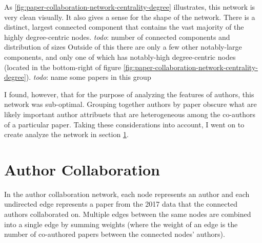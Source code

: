 \documentclass{article}
\newcommand{\todo}[1]{\textit{todo}: #1}
\begin{document}
As \ref{fig:paper-collaboration-network-centrality-degree} illustrates, this network is very clean visually.
It also gives a sense for the shape of the network.
There is a distinct, largest connected component that contains the vast majority of the highly degree-centric nodes.
\todo{number of connected components and distribution of sizes}
Outside of this there are only a few other notably-large components, and only one of which has notably-high degree-centric nodes (located in the bottom-right of figure \ref{fig:paper-collaboration-network-centrality-degree}).
\todo{name some papers in this group}

I found, however, that for the purpose of analyzing the features of authors, this network was sub-optimal.
Grouping together authors by paper obscure what are likely important author attribuets that are heterogeneous among the co-authors of a particular paper. Taking these considerations into account, I went on to create analyze the network in section \ref{sec:author-collaboration}.

\section{Author Collaboration}
\label{sec:author-collaboration}

In the author collaboration network, each node represents an author and each undirected edge represents a paper from the 2017 data that the connected authors collaborated on.
Multiple edges between the same nodes are combined into a single edge by summing weights (where the weight of an edge is the number of co-authored papers between the connected nodes' authors).
\end{document}
